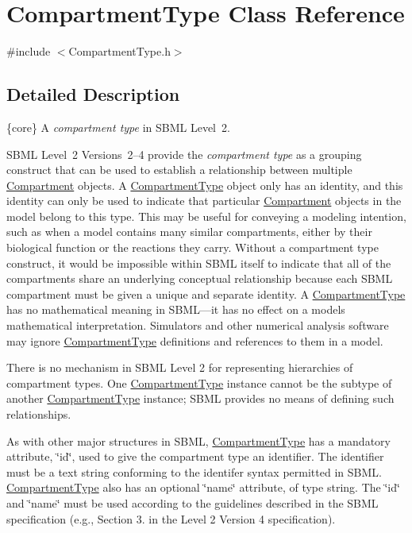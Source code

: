 \hypertarget{class_compartment_type}{}\section{Compartment\+Type Class Reference}
\label{class_compartment_type}


{\ttfamily \#include $<$Compartment\+Type.\+h$>$}



\subsection{Detailed Description}
\{core\} A {\itshape compartment type} in S\+B\+ML Level~2.

S\+B\+ML Level~2 Versions~2--4 provide the {\itshape compartment type} as a grouping construct that can be used to establish a relationship between multiple \hyperlink{class_compartment}{Compartment} objects. A \hyperlink{class_compartment_type}{Compartment\+Type} object only has an identity, and this identity can only be used to indicate that particular \hyperlink{class_compartment}{Compartment} objects in the model belong to this type. This may be useful for conveying a modeling intention, such as when a model contains many similar compartments, either by their biological function or the reactions they carry. Without a compartment type construct, it would be impossible within S\+B\+ML itself to indicate that all of the compartments share an underlying conceptual relationship because each S\+B\+ML compartment must be given a unique and separate identity. A \hyperlink{class_compartment_type}{Compartment\+Type} has no mathematical meaning in S\+B\+ML---it has no effect on a model\textquotesingle{}s mathematical interpretation. Simulators and other numerical analysis software may ignore \hyperlink{class_compartment_type}{Compartment\+Type} definitions and references to them in a model.

There is no mechanism in S\+B\+ML Level 2 for representing hierarchies of compartment types. One \hyperlink{class_compartment_type}{Compartment\+Type} instance cannot be the subtype of another \hyperlink{class_compartment_type}{Compartment\+Type} instance; S\+B\+ML provides no means of defining such relationships.

As with other major structures in S\+B\+ML, \hyperlink{class_compartment_type}{Compartment\+Type} has a mandatory attribute, \char`\"{}id\char`\"{}, used to give the compartment type an identifier. The identifier must be a text string conforming to the identifer syntax permitted in S\+B\+ML. \hyperlink{class_compartment_type}{Compartment\+Type} also has an optional \char`\"{}name\char`\"{} attribute, of type {\ttfamily string}. The \char`\"{}id\char`\"{} and \char`\"{}name\char`\"{} must be used according to the guidelines described in the S\+B\+ML specification (e.\+g., Section 3. in the Level 2 Version 4 specification).


